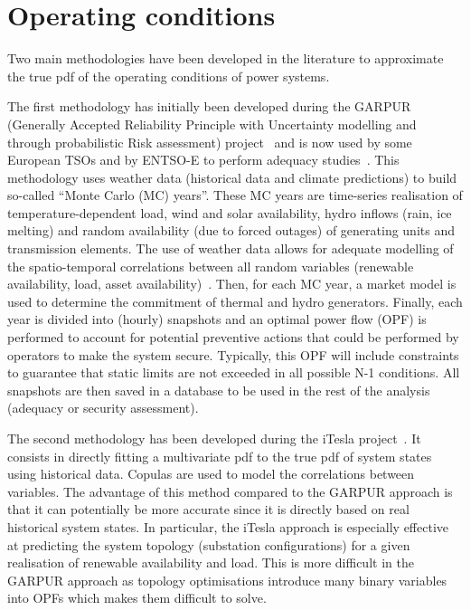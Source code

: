 \section{Operating conditions}
\label{sec:operating_conditions}

Two main methodologies have been developed in the literature to approximate the true pdf of the operating conditions of power systems.

The first methodology has initially been developed during the GARPUR (Generally Accepted Reliability Principle with Uncertainty modelling and through probabilistic Risk assessment) project~\cite{StrathElia, StrathGARPUR} and is now used by some European TSOs and by ENTSO-E to perform adequacy studies~\cite{ACER_MC_year, EliaAdequacy, ENTSOE_MC_year}. This methodology uses weather data (historical data and climate predictions) to build so-called ``Monte Carlo (MC) years''. These MC years are time-series realisation of temperature-dependent load, wind and solar availability, hydro inflows (rain, ice melting) and random availability (due to forced outages) of generating units and transmission elements. The use of weather data allows for adequate modelling of the spatio-temporal correlations between all random variables (renewable availability, load, asset availability)~\cite{StrathGARPUR, ENTSOE_MC_year}. Then, for each MC year, a market model is used to determine the commitment of thermal and hydro generators. Finally, each year is divided into (\eg hourly) snapshots and an optimal power flow (OPF) is performed to account for potential preventive actions that could be performed by operators to make the system secure. Typically, this OPF will include constraints to guarantee that static limits are not exceeded in all possible N-1 conditions. All snapshots are then saved in a database to be used in the rest of the analysis (\eg adequacy or security assessment).


The second methodology has been developed during the iTesla project~\cite{KonstantelosCopulas, EurostagHPC, iTesla_uncertainties}. It consists in directly fitting a multivariate pdf to the true pdf of system states using historical data. Copulas are used to model the correlations between variables. The advantage of this method compared to the GARPUR approach is that it can potentially be more accurate since it is directly based on real historical system states. In particular, the iTesla approach is especially effective at predicting the system topology (\ie substation configurations) for a given realisation of renewable availability and load. This is more difficult in the GARPUR approach as topology optimisations introduce many binary variables into OPFs which makes them difficult to solve.


